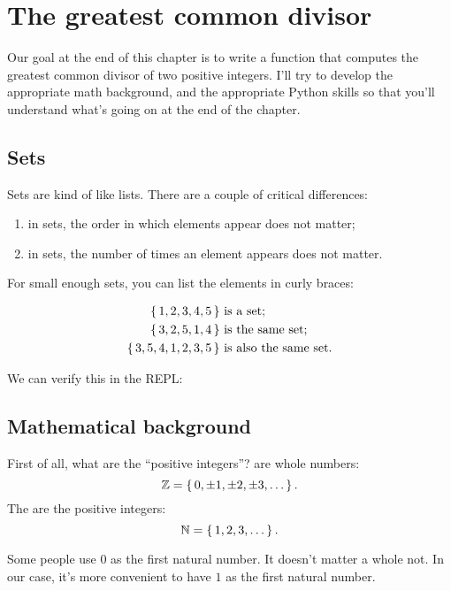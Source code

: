 \chapter{The greatest common divisor}

Our goal at the end of this chapter is to write a function that
computes the greatest common divisor of two positive integers. I'll
try to develop the appropriate math background, and the appropriate
Python skills so that you'll understand what's going on at the end of
the chapter.

\section{Sets}

Sets are kind of like lists. There are a couple of critical
differences:

\begin{enumerate}
\item in sets, the order in which elements appear does not matter;
\item in sets, the number of times an element appears does not matter.
\end{enumerate}

For small enough sets, you can list the elements in curly braces:

\begin{align*}
  \left\{\, 1,2,3,4,5 \,\right\} & \text{ is a set;} \\
  \left\{\, 3,2,5,1,4 \,\right\} & \text{ is the same set;} \\
  \left\{\, 3,5,4,1,2,3,5 \,\right\} & \text{ is also the same set.}
\end{align*}

We can verify this in the REPL:


\section{Mathematical background}

First of all, what are the ``positive integers''?  are
whole numbers: $$\mathbb{Z} = \left\{\, 0, \pm 1, \pm 2, \pm 3, \dots \,\right\}.$$ The
 are the positive integers:
$$\mathbb{N} = \left\{\, 1,2,3,\dots \,\right\}.$$

\begin{remark}
  Some people use $0$ as the first natural number. It doesn't matter a
  whole not. In our case, it's more convenient to have $1$ as the
  first natural number.
\end{remark}

